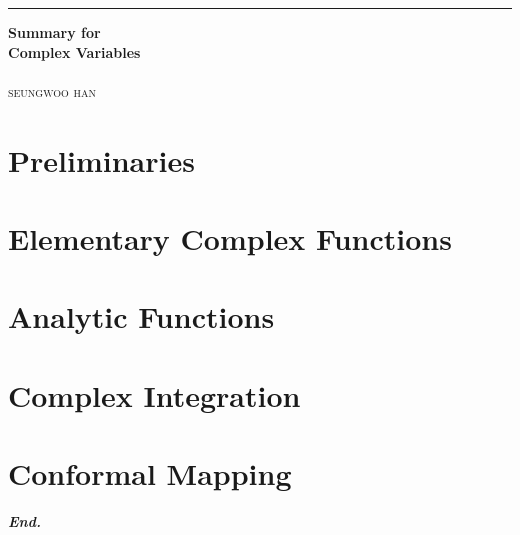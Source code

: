 \documentclass[a4paper,12pt]{report}
\begin{document}

\begin{titlepage}
	\raggedleft

	\rule{1pt}{\textheight}
	\hspace{0.05\textwidth}
	\parbox[b]{0.75\textwidth}{

        {\Huge\bfseries Summary for\\[0.5\baselineskip] Complex Variables }\\[2\baselineskip]
		\\[4\baselineskip]
		{\Large\textsc{seungwoo han}}

		\vspace{0.5\textheight}

	}
\end{titlepage}
\tableofcontents
\hypersetup{
    linkcolor=Maroon,
    filecolor=black,
    urlcolor=Maroon,
}
\pagebreak


\chapter{Preliminaries}




\chapter{Elementary Complex Functions}





\chapter{Analytic Functions}



\chapter{Complex Integration}

\chapter{Conformal Mapping}

\vfill
\begin{center}
    \textbf{\textit{End.}}
\end{center}
\end{document}
